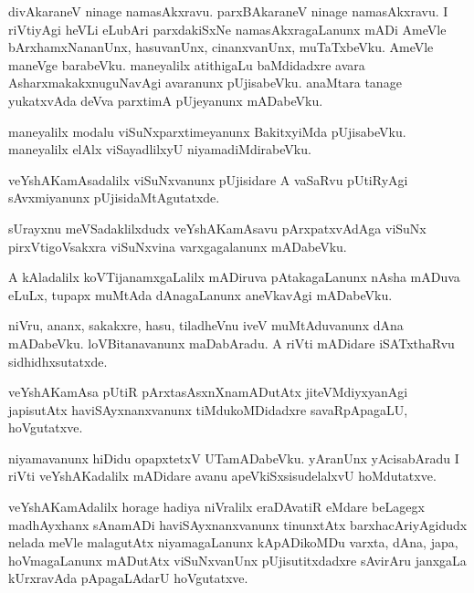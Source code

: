 \documentclass{article}
\begin{document}
\begin{mn}%
divAkaraneV ninage namasAkxravu. parxBAkaraneV ninage namasAkxravu. I riVtiyAgi heVLi 
eLubAri parxdakiSxNe namasAkxragaLanunx mADi AmeVle bArxhamxNananUnx, hasuvanUnx, 
cinanxvanUnx, muTaTxbeVku. AmeVle maneVge barabeVku. maneyalilx atithigaLu baMdidadxre 
avara AsharxmakakxnuguNavAgi avaranunx pUjisabeVku. anaMtara tanage yukatxvAda deVva 
parxtimA pUjeyanunx mADabeVku.
\end{mn}

\begin{mn}%
maneyalilx modalu viSuNxparxtimeyanunx BakitxyiMda pUjisabeVku. maneyalilx elAlx 
viSayadlilxyU niyamadiMdirabeVku.
\end{mn}

\begin{mn}%
veYshAKamAsadalilx viSuNxvanunx pUjisidare A vaSaRvu pUtiRyAgi sAvxmiyanunx 
pUjisidaMtAgutatxde.
\end{mn}

\begin{mn}%
sUrayxnu meVSadaklilxdudx veYshAKamAsavu pArxpatxvAdAga viSuNx pirxVtigoVsakxra viSuNxvina 
varxgagalanunx mADabeVku.
\end{mn}

\begin{mn}%
A kAladalilx koVTijanamxgaLalilx mADiruva pAtakagaLanunx nAsha mADuva eLuLx, tupapx muMtAda
dAnagaLanunx aneVkavAgi mADabeVku.
\end{mn}

\begin{mn}%
niVru, ananx, sakakxre, hasu, tiladheVnu iveV muMtAduvanunx dAna mADabeVku. 
loVBitanavanunx maDabAradu. A riVti mADidare iSATxthaRvu sidhidhxsutatxde.
\end{mn}

\begin{mn}%
veYshAKamAsa pUtiR pArxtasAsxnXnamADutAtx jiteVMdiyxyanAgi japisutAtx haviSAyxnanxvanunx 
tiMdukoMDidadxre savaRpApagaLU, hoVgutatxve.
\end{mn}

\begin{mn}%
niyamavanunx hiDidu opapxtetxV UTamADabeVku. yAranUnx yAcisabAradu I riVti veYshAKadalilx 
mADidare avanu apeVkiSxsisudelalxvU hoMdutatxve.
\end{mn}

\begin{mn}%
veYshAKamAdalilx horage hadiya niVralilx eraDAvatiR eMdare beLagegx madhAyxhanx sAnamADi 
haviSAyxnanxvanunx tinunxtAtx barxhacAriyAgidudx nelada meVle malagutAtx niyamagaLanunx 
kApADikoMDu varxta, dAna, japa, hoVmagaLanunx mADutAtx viSuNxvanUnx pUjisutitxdadxre 
sAvirAru janxgaLa kUrxravAda pApagaLAdarU hoVgutatxve.
\end{mn}
\end{document}
